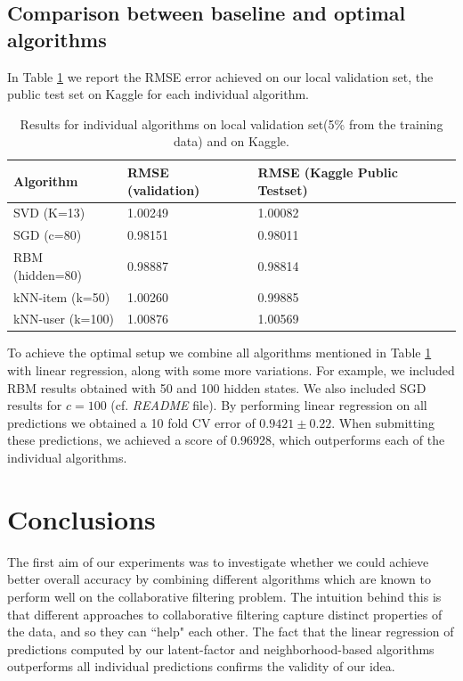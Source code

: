 \documentclass[10pt,conference,compsocconf]{IEEEtran}
\begin{document}
	\subsection{Comparison between baseline and optimal algorithms}
	In Table \ref{tab:res} we report the RMSE error achieved on our local validation set, the public test set on Kaggle for each individual algorithm.
	\begin{table}
		\begin{tabular}{ |p{2.8cm}||p{2.4cm}|p{2.3cm}|  }
			\hline
			Algorithm & RMSE (validation) & RMSE (Kaggle Public Testset) \\ [0.5ex] 
			\hline\hline
			SVD (K=13) & 1.00249 & 1.00082 \\ 
			\hline
			SGD (c=80) & 0.98151
			 &  0.98011 \\
			\hline
			RBM (hidden=80) & 0.98887 & 0.98814 \\
			\hline
			kNN-item (k=50) & 1.00260 & 0.99885 \\ 
			\hline
			kNN-user (k=100) & 1.00876 & 1.00569 \\ [1ex] 
			\hline
		\end{tabular}
	\caption{Results for individual algorithms on local validation set(5\% from the training data) and on Kaggle. }
		\label{tab:res}
	\end{table}
	
	To achieve the optimal setup we combine all algorithms mentioned in Table \ref{tab:res} with linear regression, along with some more variations. For example, we included RBM results obtained with 50 and 100 hidden states. We also included SGD results for $c = 100$ (cf. \textit{README} file). By performing linear regression on all predictions we obtained a 10 fold CV error of $0.9421\pm{0.22}$. When submitting these predictions, we achieved a score of 0.96928, which outperforms each of the individual algorithms.
	
	\section{Conclusions}
	\label{sec:conclusions}
	
	The first aim of our experiments was to investigate whether we could achieve better overall accuracy by combining different algorithms which are known to perform well on the collaborative filtering problem. The intuition behind this is that different approaches to collaborative filtering capture distinct properties of the data, and so they can ``help" each other. The fact that the linear regression of predictions computed by our latent-factor and neighborhood-based algorithms outperforms all individual predictions confirms the validity of our idea.
	
\end{document}
